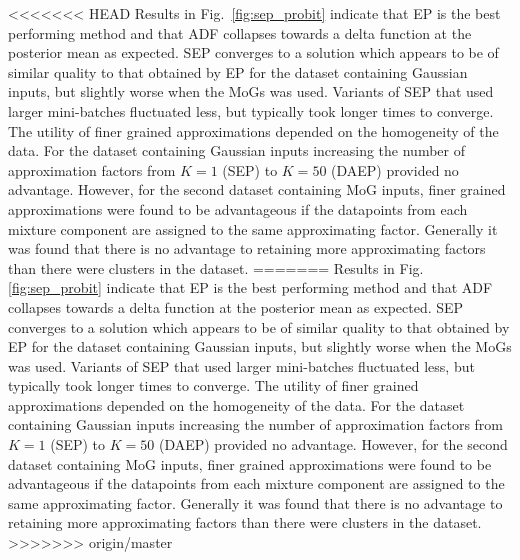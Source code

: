 
<<<<<<< HEAD
Results in Fig.~\ref{fig:sep_probit} indicate that EP is the best performing method and that ADF collapses towards a delta function at the posterior mean as expected. SEP converges to a solution which appears to be of similar quality to that obtained by EP for the dataset containing Gaussian inputs, but slightly worse when the MoGs was used. Variants of SEP that used larger mini-batches fluctuated less, but typically took longer times to converge. The utility of finer grained approximations depended on the homogeneity of the data. For the dataset containing Gaussian inputs increasing the number of approximation factors from $K=1$ (SEP) to $K=50$ (DAEP) provided no advantage. However, for the second dataset containing MoG inputs, finer grained approximations were found to be advantageous if the datapoints from each mixture component are assigned to the same approximating factor. Generally it was found that there is no advantage to retaining more approximating factors than there were clusters in the dataset.  
=======
Results in Fig. \ref{fig:sep_probit} indicate that EP is the best performing method and that ADF collapses towards a delta function at the posterior mean as expected. SEP converges to a solution which appears to be of similar quality to that obtained by EP for the dataset containing Gaussian inputs, but slightly worse when the MoGs was used. Variants of SEP that used larger mini-batches fluctuated less, but typically took longer times to converge. The utility of finer grained approximations depended on the homogeneity of the data. For the dataset containing Gaussian inputs increasing the number of approximation factors from $K=1$ (SEP) to $K=50$ (DAEP) provided no advantage. However, for the second dataset containing MoG inputs, finer grained approximations were found to be advantageous if the datapoints from each mixture component are assigned to the same approximating factor. Generally it was found that there is no advantage to retaining more approximating factors than there were clusters in the dataset.  
>>>>>>> origin/master


